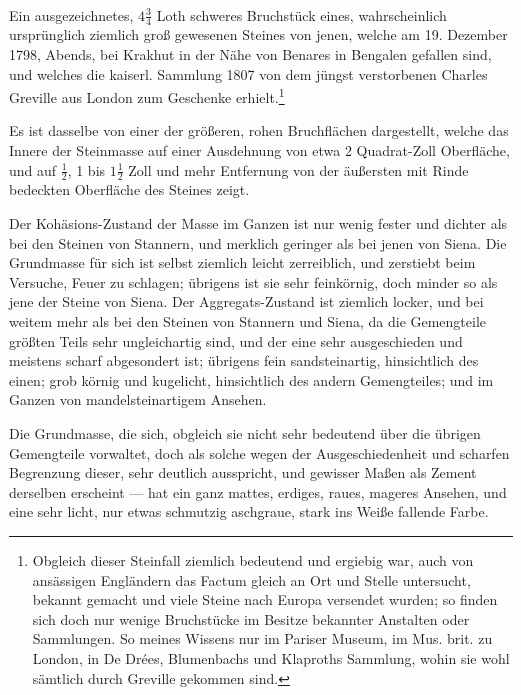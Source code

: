 \documentclass[a4paper, 11pt, oneside, german]{article}
\begin{document}
\paragraph{}
Ein ausgezeichnetes, $4\frac{3}{4}$ Loth schweres Bruchstück eines, wahrscheinlich ursprünglich ziemlich groß gewesenen Steines von jenen, welche am 19. Dezember 1798, Abends, bei Krakhut in der Nähe von Benares in Bengalen gefallen sind, und welches die kaiserl. Sammlung 1807 von dem jüngst verstorbenen Charles Greville aus London zum Geschenke erhielt.\footnote{Obgleich dieser Steinfall ziemlich bedeutend und ergiebig war, auch von ansässigen Engländern das Factum gleich an Ort und Stelle untersucht, bekannt gemacht und viele Steine nach Europa versendet wurden; so finden sich doch nur wenige Bruchstücke im Besitze bekannter Anstalten oder Sammlungen. So meines Wissens nur im Pariser Museum, im Mus. brit. zu London, in De Drées, Blumenbachs und Klaproths Sammlung, wohin sie wohl sämtlich durch Greville gekommen sind.}

Es ist dasselbe von einer der größeren, rohen Bruchflächen dargestellt, welche das Innere der Steinmasse auf einer Ausdehnung von etwa 2 Quadrat-Zoll Oberfläche, und auf $\frac{1}{2}$, 1 bis $1\frac{1}{2}$ Zoll und mehr Entfernung von der äußersten mit Rinde bedeckten Oberfläche des Steines zeigt.

Der Kohäsions-Zustand der Masse im Ganzen ist nur wenig fester und dichter als bei den Steinen von Stannern, und merklich geringer als bei jenen von Siena. Die Grundmasse für sich ist selbst ziemlich leicht zerreiblich, und zerstiebt beim Versuche, Feuer zu schlagen; übrigens ist sie sehr feinkörnig, doch minder so als jene der Steine von Siena. Der Aggregats-Zustand ist ziemlich locker, und bei weitem mehr als bei den Steinen von Stannern und Siena, da die Gemengteile größten Teils sehr ungleichartig sind, und der eine sehr ausgeschieden und meistens scharf abgesondert ist; übrigens fein sandsteinartig, hinsichtlich des einen; grob körnig und kugelicht, hinsichtlich des andern Gemengteiles; und im Ganzen von mandelsteinartigem Ansehen.

Die Grundmasse, die sich, obgleich sie nicht sehr bedeutend über die übrigen Gemengteile vorwaltet, doch als solche wegen der Ausgeschiedenheit und scharfen Begrenzung dieser, sehr deutlich ausspricht, und gewisser Maßen als Zement derselben erscheint --- hat ein ganz mattes, erdiges, raues, mageres Ansehen, und eine sehr licht, nur etwas schmutzig aschgraue, stark ins Weiße fallende Farbe.
\end{document}
